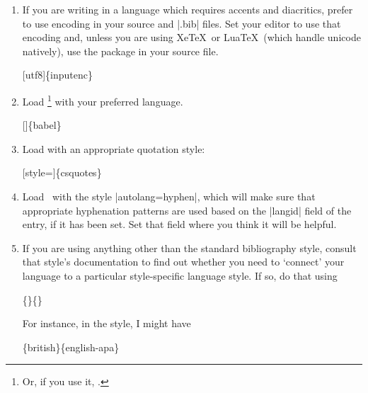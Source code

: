 \begin{enumerate}
\item If you are writing in a language which requires accents and
  diacritics, prefer to use  encoding in your source
  and |.bib| files. Set your editor to use that encoding and, unless
  you are using Xe\TeX\ or Lua\TeX\ (which handle unicode natively),
  use the  package in your source file.
 \begin{pseudoverb}
 [utf8]\{inputenc\}
 \end{pseudoverb}
\item Load \footnote{Or, if you use it,
    .} with your preferred
  language.
 \begin{pseudoverb}
   []\{babel\}
 \end{pseudoverb}
\item Load  with an appropriate quotation style:
 \begin{pseudoverb}
   [style=]\{csquotes\}
 \end{pseudoverb}
\item Load \biblatex\ with the style |autolang=hyphen|, which will
  make sure that appropriate hyphenation patterns are used based on
  the |langid| field of the entry, if it has been set. Set that field
  where you think it will be helpful.
\item If you are using anything other than the standard bibliography
  style, consult that style's documentation to find out whether you
  need to `connect' your language to a particular style-specific
  language style. If so, do that using
 \begin{pseudoverb}
   \{\}\{\}
 \end{pseudoverb}
 For instance, in the  style, I might have
 \begin{pseudoverb}
   \{british\}\{english-apa\}
 \end{pseudoverb}
\end{enumerate}

